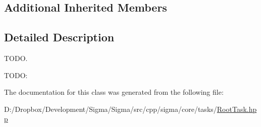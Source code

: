 \subsection*{Additional Inherited Members}


\subsection{Detailed Description}
T\+O\+D\+O. 

T\+O\+D\+O\+: 

The documentation for this class was generated from the following file\+:\begin{DoxyCompactItemize}
\item 
D\+:/\+Dropbox/\+Development/\+Sigma/\+Sigma/src/cpp/sigma/core/tasks/\hyperlink{_root_task_8hpp}{Root\+Task.\+hpp}\end{DoxyCompactItemize}
